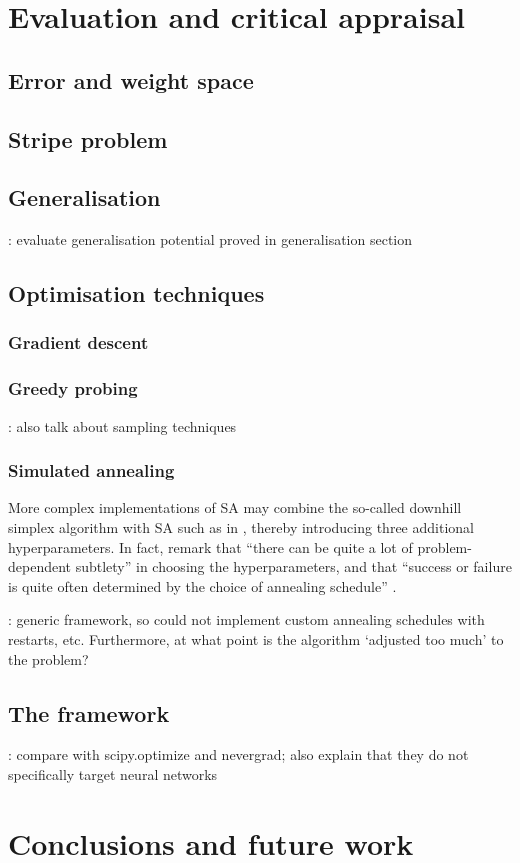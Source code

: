 \chapter{Evaluation and critical appraisal}

\section{Error and weight space}
\todo

\section{Stripe problem}
\todo

\section{Generalisation}
\todo: evaluate generalisation potential proved in generalisation section

\section{Optimisation techniques}
\subsection{Gradient descent}
\todo
\subsection{Greedy probing}
\todo: also talk about sampling techniques
\subsection{Simulated annealing}
\label{sec:eval_sim_annealing}
More complex implementations of SA may combine the so-called downhill simplex algorithm \cite{nelder1965} with SA such as in \textcite[p. 444-455]{press1992}, thereby introducing three additional hyperparameters.
In fact, \citeauthor{press1992} remark that ``there can be quite a lot of problem-dependent subtlety'' in choosing the hyperparameters, and that ``success or failure is quite often determined by the choice of annealing schedule'' \cite*[p. 452]{press1992}.

\todo: generic framework, so could not implement custom annealing schedules with restarts, etc.
Furthermore, at what point is the algorithm `adjusted too much' to the problem?

\section{The framework}
\todo: compare with scipy.optimize and nevergrad; also explain that they do not specifically target neural networks

\chapter{Conclusions and future work}
\todo
